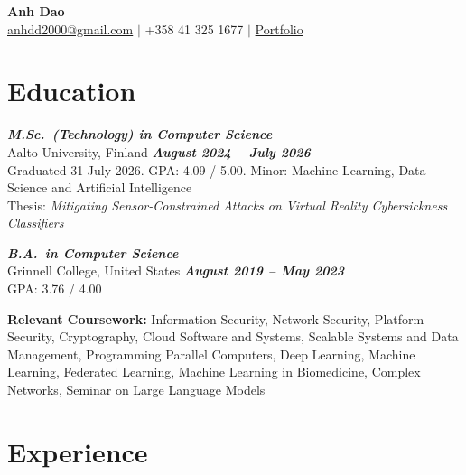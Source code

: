 \documentclass[11pt,a4paper]{article}
\begin{document}
\begin{center}
    {\LARGE\bfseries Anh Dao}\\[6pt]
    \href{mailto:anhdd2000@gmail.com}{anhdd2000@gmail.com} $\vert$ 
    +358 41 325 1677 $\vert$ 
    \href{https://daoa0601.github.io/}{Portfolio}
\end{center}

\section{Education}

\noindent\textbf{\textit{M.Sc.\ (Technology) in Computer Science}}\\
Aalto University, Finland \hfill \textbf{\textit{August 2024 -- July 2026}}\\
Graduated 31 July 2026. GPA: 4.09 / 5.00. Minor: Machine Learning, Data Science and Artificial Intelligence\\
Thesis: \textit{Mitigating Sensor-Constrained Attacks on Virtual Reality Cybersickness Classifiers}

\vspace{8pt}

\noindent\textbf{\textit{B.A.\ in Computer Science}}\\
Grinnell College, United States \hfill \textbf{\textit{August 2019 -- May 2023}}\\
GPA: 3.76 / 4.00

\vspace{8pt}

\noindent\textbf{Relevant Coursework:} Information Security, Network Security, Platform Security, Cryptography, Cloud Software and Systems, Scalable Systems and Data Management, Programming Parallel Computers, Deep Learning, Machine Learning, Federated Learning, Machine Learning in Biomedicine, Complex Networks, Seminar on Large Language Models

\section{Experience}
\end{document}
